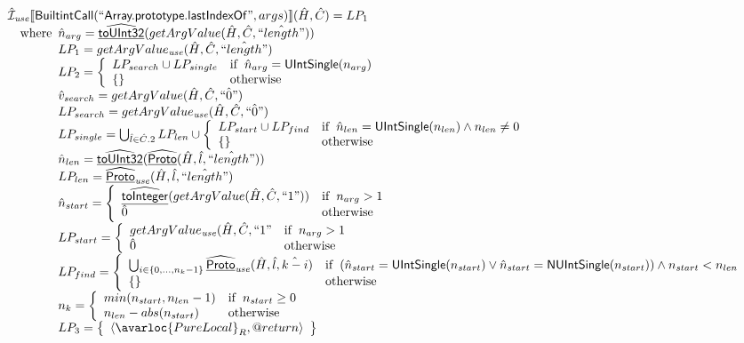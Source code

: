 \[
\begin{array}{l}

\aI_{\it use}\lbr \SF{BuiltintCall}(``\SF{Array.prototype.lastIndexOf}",args)\rbr(\hat{H},\hat{C}) =LP_1\\
\quad\wherec{
  \hat{n}_{arg} = \ahf{toUInt32}(getArgValue(\hat{H}, \hat{C}, \hat{``length"}))\\
  LP_1 = getArgValue_{\it use}(\hat{H}, \hat{C}, \hat{``length"})\\
  LP_2 = \left\{\begin{array}{ll}
      LP_{search} \cup LP_{single} & \ifc{\hat{n}_{arg} = \SF{UIntSingle}(n_{arg})}\\
      \set{} & \owc
    \end{array}\right.\\
  \hat{v}_{search} = getArgValue(\hat{H}, \hat{C}, \hat{``0"})\\
  LP_{search} = getArgValue_{\it use}(\hat{H}, \hat{C}, \hat{``0"})\\
  LP_{single} = \bigcup_{\hat{l} \in \hat{C}.2}  LP_{len} \cup \left\{\begin{array}{ll}
      LP_{start} \cup LP_{find}
      & \ifc{\hat{n}_{len} = \SF{UIntSingle}(n_{len}) \land n_{len} \neq 0}\\
     \set{} & \owc
    \end{array}\right.\\
  \hat{n}_{len} = \ahf{toUInt32}(\ahf{Proto}(\hat{H}, \hat{l}, \hat{``length"}))\\
  LP_{len} =  \ahf{Proto}_{\it use}(\hat{H}, \hat{l}, \hat{``length"})\\
  \hat{n}_{start} = \left\{\begin{array}{ll}
      \ahf{toInteger}(getArgValue(\hat{H}, \hat{C}, ``1")) & \ifc{n_{arg} > 1}\\
      \hat{0} & \owc
    \end{array}\right.\\
  LP_{start} = \left\{\begin{array}{ll}
      getArgValue_{\it use}(\hat{H}, \hat{C}, ``1" & \ifc{n_{arg} > 1}\\
      \hat{0} & \owc
    \end{array}\right.\\
  LP_{find} = \left\{\begin{array}{ll}
      \bigcup_{i \in \{0,...,n_k-1\}} \ahf{Proto}_{\it use}(\hat{H}, \hat{l}, \hat{k-i})
      & \ifc{(\hat{n}_{start} = \SF{UIntSingle}(n_{start}) \lor \hat{n}_{start} = \SF{NUIntSingle}(n_{start})) \land n_{start} < n_{len}}\\
      \set{} & \owc
    \end{array}\right.\\
  n_k = \left\{\begin{array}{ll}
      min(n_{start}, n_{len}-1) & \ifc{n_{start} \geq 0}\\
      n_{len} - abs(n_{start}) & \owc
    \end{array}\right.\\
  LP_3 = \set{\langle\avarloc{PureLocal}_R,\varprop{return}\rangle}\\
  }\\
\\


\end{array}\]
